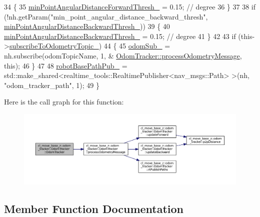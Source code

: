 \begin{DoxyCode}
34     \{
35         \hyperlink{classcl__move__base__z_1_1odom__tracker_1_1OdomTracker_a3567ebfbc56db63e0fad52e0c4936c30}{minPointAngularDistanceForwardThresh\_} = 0.15; \textcolor{comment}{// degree}
36     \}
37 
38     \textcolor{keywordflow}{if} (!nh.getParam(\textcolor{stringliteral}{"min\_point\_angular\_distance\_backward\_thresh"}, 
      \hyperlink{classcl__move__base__z_1_1odom__tracker_1_1OdomTracker_a2d166d65e97d4aa7851c45fd81985a85}{minPointAngularDistanceBackwardThresh\_}))
39     \{
40         \hyperlink{classcl__move__base__z_1_1odom__tracker_1_1OdomTracker_a2d166d65e97d4aa7851c45fd81985a85}{minPointAngularDistanceBackwardThresh\_} = 0.15; \textcolor{comment}{// degree}
41     \}
42 
43     \textcolor{keywordflow}{if} (this->\hyperlink{classcl__move__base__z_1_1odom__tracker_1_1OdomTracker_afbe614b53a1493eb8268b8ea65b5b93a}{subscribeToOdometryTopic\_})
44     \{
45         \hyperlink{classcl__move__base__z_1_1odom__tracker_1_1OdomTracker_ab55df0e91246e43dff80912dc35a4fee}{odomSub\_} = nh.subscribe(odomTopicName, 1, &
      \hyperlink{classcl__move__base__z_1_1odom__tracker_1_1OdomTracker_a12c5a839cfde2e8f2f55a5e0c9647b18}{OdomTracker::processOdometryMessage}, \textcolor{keyword}{this});
46     \}
47 
48     \hyperlink{classcl__move__base__z_1_1odom__tracker_1_1OdomTracker_a40a7cbb6bb6595e250e7c685c781613b}{robotBasePathPub\_} = std::make\_shared<realtime\_tools::RealtimePublisher<nav\_msgs::Path>
      >(nh, \textcolor{stringliteral}{"odom\_tracker\_path"}, 1);
49 \}
\end{DoxyCode}


Here is the call graph for this function\+:
\nopagebreak
\begin{figure}[H]
\begin{center}
\leavevmode
\includegraphics[width=350pt]{classcl__move__base__z_1_1odom__tracker_1_1OdomTracker_ae3a5615aa45b7acf11e650e98ab10950_cgraph}
\end{center}
\end{figure}




\subsection{Member Function Documentation}
